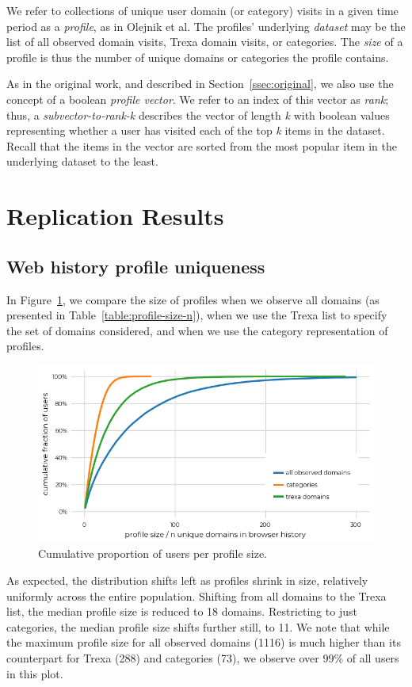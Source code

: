 \documentclass[letterpaper,twocolumn,10pt]{article}
\begin{document}
We refer to collections of unique user domain (or category) visits in a given time period as a \textit{profile}, as in Olejnik et al.
The profiles' underlying \textit{dataset} may be the list of all observed domain visits, Trexa domain visits, or categories. 
The \textit{size} of a profile is thus the number of unique domains or categories the profile contains.

As in the original work, and described in Section~\ref{ssec:original}, we also use the concept of a boolean \textit{profile vector}. We refer to an index of this vector as \textit{rank}; thus, a \textit{subvector-to-rank-k} describes the vector of length \textit{k} with boolean values representing whether a user has visited each of the top \textit{k} items in the dataset. Recall that the items in the vector are sorted from the most popular item in the underlying dataset to the least. 
%
\section{Replication Results}
\label{sec:replication}
%
\subsection{Web history profile uniqueness}
\label{ssec:repro-profile-uniqueness}
In Figure~\ref{fig:n_users_per_profile_size}, we compare the size of profiles when we observe all domains (as presented in Table~\ref{table:profile-size-n}), when we use the Trexa list to specify the set of domains considered, and when we use the category representation of profiles.
\begin{figure}[hb]
    \centering
    \includegraphics[width=\linewidth]{figures/fig1a_cdf.png}
    \caption{Cumulative proportion of users per profile size.}
    \label{fig:n_users_per_profile_size}
\end{figure}
%
As expected, the distribution shifts left as profiles shrink in size, relatively uniformly across the entire population.
Shifting from all domains to the Trexa list, the median profile size is reduced to 18 domains. 
Restricting to just categories, the median profile size shifts further still, to 11. 
We note that while the maximum profile size for all observed domains (1116) is much higher than its counterpart for Trexa (288) and categories (73), we observe over 99\% of all users in this plot.
\end{document}
